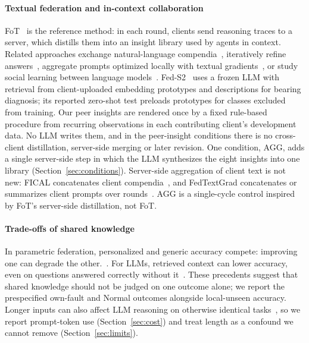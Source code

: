 \documentclass[conference]{IEEEtran}
\newcommand{\cond}[1]{\textsf{#1}}
\begin{document}
\paragraph{Textual federation and in-context collaboration}
FoT~\cite{yao2026fot} is the reference method: in each round, clients send reasoning traces to a server, which distills them into an insight library used by agents in context. Related approaches exchange natural-language compendia~\cite{wu2024fical}, iteratively refine answers~\cite{wang2025fedicl}, aggregate prompts optimized locally with textual gradients~\cite{chen2025fedtextgrad}, or study social learning between language models~\cite{mohtashami2023social}. Fed-S2~\cite{zhang2026feds2} uses a frozen LLM with retrieval from client-uploaded embedding prototypes and descriptions for bearing diagnosis; its reported zero-shot test preloads prototypes for classes excluded from training. Our peer insights are rendered once by a fixed rule-based procedure from recurring observations in each contributing client's development data. No LLM writes them, and in the peer-insight conditions there is no cross-client distillation, server-side merging or later revision. One condition, \cond{AGG}, adds a single server-side step in which the LLM synthesizes the eight insights into one library (Section~\ref{sec:conditions}). Server-side aggregation of client text is not new: FICAL concatenates client compendia~\cite{wu2024fical}, and FedTextGrad concatenates or summarizes client prompts over rounds~\cite{chen2025fedtextgrad}. \cond{AGG} is a single-cycle control inspired by FoT's server-side distillation, not FoT.

\paragraph{Trade-offs of shared knowledge}
In parametric federation, personalized and generic accuracy compete: improving one can degrade the other.~\cite{chen2022fedrod}. For LLMs, retrieved context can lower accuracy, even on questions answered correctly without it~\cite{mallen2023trust,yoran2024robust}. These precedents suggest that shared knowledge should not be judged on one outcome alone; we report the prespecified own-fault and Normal outcomes alongside local-unseen accuracy. Longer inputs can also affect LLM reasoning on otherwise identical tasks~\cite{levy2024same}, so we report prompt-token use (Section~\ref{sec:cost}) and treat length as a confound we cannot remove (Section~\ref{sec:limits}).
\end{document}
